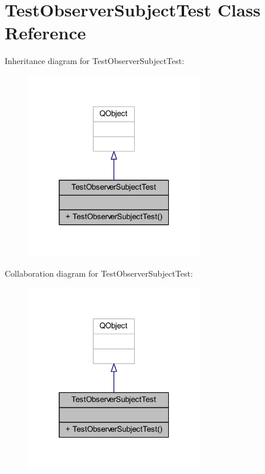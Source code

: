 \hypertarget{class_test_observer_subject_test}{}\section{Test\+Observer\+Subject\+Test Class Reference}
\label{class_test_observer_subject_test}


Inheritance diagram for Test\+Observer\+Subject\+Test\+:\nopagebreak
\begin{figure}[H]
\begin{center}
\leavevmode
\includegraphics[width=220pt]{d5/d93/class_test_observer_subject_test__inherit__graph}
\end{center}
\end{figure}


Collaboration diagram for Test\+Observer\+Subject\+Test\+:\nopagebreak
\begin{figure}[H]
\begin{center}
\leavevmode
\includegraphics[width=220pt]{d6/d96/class_test_observer_subject_test__coll__graph}
\end{center}
\end{figure}


